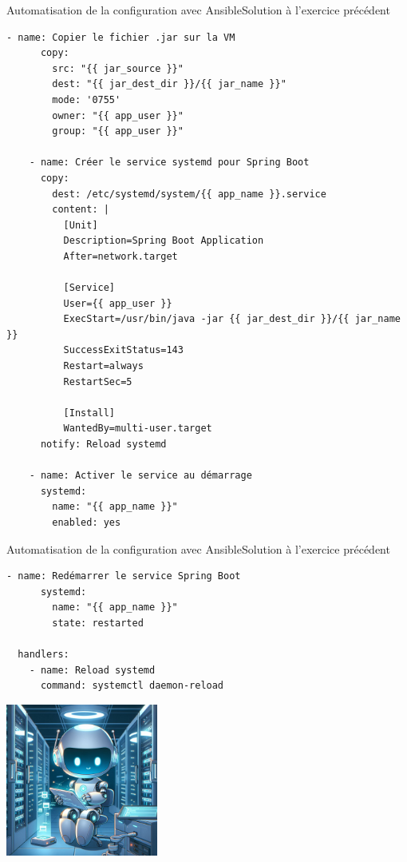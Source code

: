 \documentclass{beamer}
\begin{document}
    \begin{frame}[fragile]{Automatisation de la configuration avec Ansible}{Solution à l'exercice précédent}
        \begin{lstlisting}[basicstyle=\ttfamily\tiny]
    - name: Copier le fichier .jar sur la VM
      copy:
        src: "{{ jar_source }}"
        dest: "{{ jar_dest_dir }}/{{ jar_name }}"
        mode: '0755'
        owner: "{{ app_user }}"
        group: "{{ app_user }}"

    - name: Créer le service systemd pour Spring Boot
      copy:
        dest: /etc/systemd/system/{{ app_name }}.service
        content: |
          [Unit]
          Description=Spring Boot Application
          After=network.target

          [Service]
          User={{ app_user }}
          ExecStart=/usr/bin/java -jar {{ jar_dest_dir }}/{{ jar_name }}
          SuccessExitStatus=143
          Restart=always
          RestartSec=5

          [Install]
          WantedBy=multi-user.target
      notify: Reload systemd

    - name: Activer le service au démarrage
      systemd:
        name: "{{ app_name }}"
        enabled: yes
        \end{lstlisting}
    \end{frame}

    \begin{frame}[fragile]{Automatisation de la configuration avec Ansible}{Solution à l'exercice précédent}
        \begin{lstlisting}[basicstyle=\ttfamily\tiny]
    - name: Redémarrer le service Spring Boot
      systemd:
        name: "{{ app_name }}"
        state: restarted

  handlers:
    - name: Reload systemd
      command: systemctl daemon-reload
        \end{lstlisting}
        \bigbreak
        \begin{center}
            \includegraphics[width=5cm]{image/zen-automaton-configuration}
        \end{center}
    \end{frame}
\end{document}

